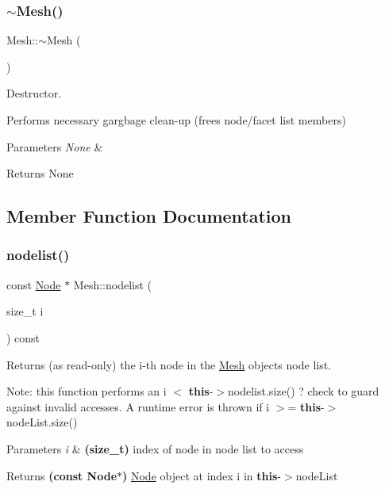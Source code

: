 \subsubsection{\texorpdfstring{$\sim$\+Mesh()}{~Mesh()}}
{\footnotesize\ttfamily Mesh\+::$\sim$\+Mesh (\begin{DoxyParamCaption}{ }\end{DoxyParamCaption})}



Destructor. 

Performs necessary gargbage clean-\/up (frees node/facet list members) 
\begin{DoxyParams}{Parameters}
{\em None} & \\
\hline
\end{DoxyParams}
\begin{DoxyReturn}{Returns}
None 
\end{DoxyReturn}


\subsection{Member Function Documentation}
\mbox{\label{class_mesh_afbb98e084a07e94b5d3ad503aaa82e08}} 
\subsubsection{\texorpdfstring{nodelist()}{nodelist()}}
{\footnotesize\ttfamily const \mbox{\hyperlink{class_node}{Node}} $\ast$ Mesh\+::nodelist (\begin{DoxyParamCaption}\item[{size\+\_\+t}]{i }\end{DoxyParamCaption}) const}



Returns (as read-\/only) the i-\/th node in the \mbox{\hyperlink{class_mesh}{Mesh}} objects node list. 

Note\+: this function performs an i $<$ {\bfseries this}-\/$>$nodelist.\+size() ? check to guard against invalid accesses. A runtime error is thrown if i $>$= {\bfseries this}-\/$>$node\+List.\+size() 
\begin{DoxyParams}{Parameters}
{\em i} & {\bfseries (size\+\_\+t)} index of node in node list to access \\
\hline
\end{DoxyParams}
\begin{DoxyReturn}{Returns}
{\bfseries (const Node$\ast$)} \mbox{\hyperlink{class_node}{Node}} object at index i in {\bfseries this}-\/$>$node\+List 
\end{DoxyReturn}
\mbox{\label{class_mesh_a732e258583e090537f7c47b9a7594e85}} 
